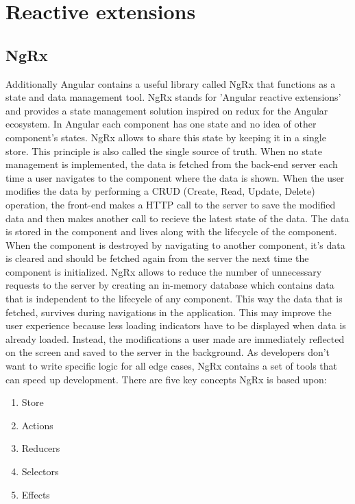\autocite{Exbrayat2019}

\section {Reactive extensions}
\subsection{NgRx}
Additionally Angular contains a useful library called NgRx that functions as a state and data management tool. NgRx stands for 'Angular reactive extensions' and provides a state management solution inspired on redux for the Angular ecosystem. In Angular each component has one state and no idea of other component's states. NgRx allows to share this state by keeping it in a single store. This principle is also called the single source of truth. When no state management is implemented, the data is fetched from the back-end server each time a user navigates to the component where the data is shown. When the user modifies the data by performing a CRUD (Create, Read, Update, Delete) operation, the front-end makes a HTTP call to the server to save the modified data and then makes another call to recieve the latest state of the data. The data is stored in the component and lives along with the lifecycle of the component. When the component is destroyed by navigating to another component, it's data is cleared and should be fetched again from the server the next time the component is initialized. NgRx allows to reduce the number of unnecessary requests to the server by creating an in-memory database which contains data that is independent to the lifecycle of any component. This way the data that is fetched, survives during navigations in the application. This may improve the user experience because less loading indicators have to be displayed when data is already loaded. Instead, the modifications a user made are immediately reflected on the screen and saved to the server in the background. As developers don't want to write specific logic for all edge cases, NgRx contains a set of tools that can speed up development. There are five key concepts NgRx is based upon:
\begin{enumerate}
	\item Store
	\item Actions
	\item Reducers
	\item Selectors
	\item Effects
\end{enumerate}

